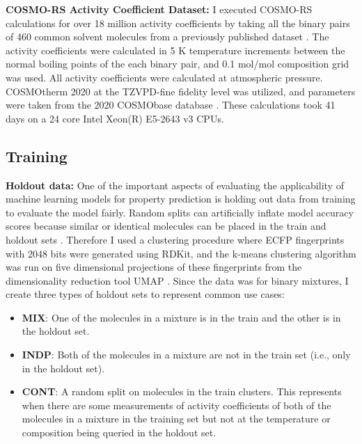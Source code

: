 \noindent
\textbf{COSMO-RS Activity Coefficient Dataset:} I executed COSMO-RS calculations for over 18 million activity coefficients by taking all the binary pairs of 460 common solvent molecules from a previously published dataset \cite{Amar2019}. The activity coefficients were calculated in 5 K temperature increments between the normal boiling points of the each binary pair, and 0.1 mol/mol composition grid was used. All activity coefficients were calculated at atmospheric pressure. COSMOtherm 2020 at the TZVPD-fine fidelity level was utilized, and parameters were taken from the 2020 COSMObase database \cite{Klamt2010}. These calculations took 41 days on a 24 core Intel Xeon(R) E5-2643 v3 CPUs. 


\subsection{Training}
\noindent
\textbf{Holdout data:} One of the important aspects of evaluating the applicability of machine learning models for property prediction is holding out data from training to evaluate the model fairly. Random splits can artificially inflate model accuracy scores because similar or identical molecules can be placed in the train and holdout sets \cite{Kovacs2021}. Therefore I used a clustering procedure where  ECFP fingerprints with 2048 bits were generated using RDKit, and the k-means clustering algorithm \cite{MacQueen1967} was run on five dimensional projections of these fingerprints from the dimensionality reduction tool UMAP \cite{McInnes2018}. Since the data was for binary mixtures, I create three types of holdout sets to represent common use cases:

\begin{itemize}
    \item \textbf{MIX}: One of the molecules in a mixture is in the train and the other is in the holdout set.
    \item \textbf{INDP}: Both of the molecules in a mixture are not in the train set (i.e., only in the holdout set).
    \item \textbf{CONT}: A random split on molecules in the train clusters. This represents when there are some measurements of activity coefficients of both of the molecules in a mixture in the training set but not at the temperature or composition being queried in the holdout set. 
\end{itemize}

